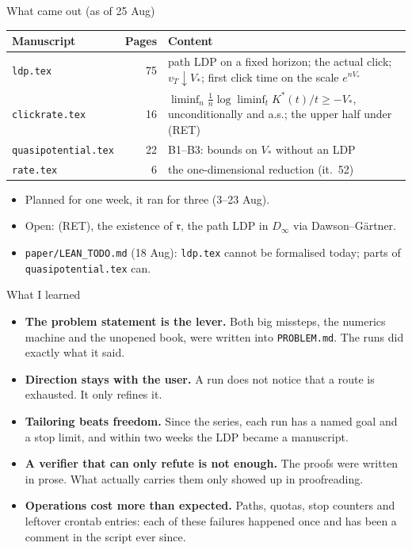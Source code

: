\documentclass[11pt,aspectratio=169]{beamer}
\newcommand{\datei}[1]{\texttt{#1}}
\begin{document}
\begin{frame}{What came out (as of 25 Aug)}
  \small
  \begin{tabular}{@{}lrp{}@{}}
    \toprule
    Manuscript & Pages & Content \\
    \midrule
    \datei{ldp.tex} & 75 & path LDP on a fixed horizon; the actual click; $v_T\downarrow V_\ast$;
                         first click time on the scale $e^{nV_\ast}$ \\
    \datei{clickrate.tex} & 16 & $\liminf_n\frac1n\log\liminf_t K^\ast(t)/t\ge-V_\ast$,
                         unconditionally and a.s.; the upper half under (RET) \\
    \datei{quasipotential.tex} & 22 & B1--B3: bounds on $V_\ast$ without an LDP \\
    \datei{rate.tex} & 6 & the one-dimensional reduction (it.~52) \\
    \bottomrule
  \end{tabular}

  \bigskip
  \begin{itemize}
  \item Planned for one week, it ran for three (3--23 Aug).
  \item Open: (RET), the existence of $\mathfrak r$, the path LDP in $D_\infty$ via
    Dawson--Gärtner.
  \item \datei{paper/LEAN\_TODO.md} (18 Aug): \datei{ldp.tex} cannot be formalised today;
    parts of \datei{quasipotential.tex} can.
  \end{itemize}
\end{frame}

\begin{frame}{What I learned}
  \begin{itemize}
  \setlength\itemsep{6pt}
  \item \textbf{The problem statement is the lever.} Both big missteps, the numerics
    machine and the unopened book, were written into \datei{PROBLEM.md}. The runs did
    exactly what it said.
  \item \textbf{Direction stays with the user.} A run does not notice that a route is
    exhausted. It only refines it.
  \item \textbf{Tailoring beats freedom.} Since the series, each run has a named goal and a
    stop limit, and within two weeks the LDP became a manuscript.
  \item \textbf{A verifier that can only refute is not enough.} The proofs were written in
    prose. What actually carries them only showed up in proofreading.
  \item \textbf{Operations cost more than expected.} Paths, quotas, stop counters and
    leftover crontab entries: each of these failures happened once and has been a comment
    in the script ever since.
  \end{itemize}
\end{frame}
\end{document}
